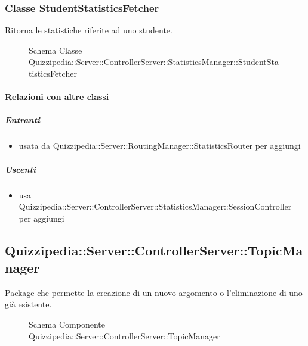 \subsubsection{Classe StudentStatisticsFetcher}
Ritorna le statistiche riferite ad uno studente.
\begin{figure}[H]
\centering
\noindent{}
\caption[Schema Classe StudentStatisticsFetcher]{Schema Classe Quizzipedia::Server::ControllerServer::StatisticsManager::StudentStatisticsFetcher}
\end{figure}
\paragraph{Relazioni con altre classi}
\subparagraph{Entranti}
\begin{itemize}
\item usata da Quizzipedia::Server::RoutingManager::StatisticsRouter per aggiungi
\end{itemize}
\subparagraph{Uscenti}
\begin{itemize}
\item usa Quizzipedia::Server::ControllerServer::StatisticsManager::SessionController per aggiungi
\end{itemize}
\subsection{Quizzipedia::Server::ControllerServer::TopicManager}
Package che permette la creazione di un nuovo argomento o l'eliminazione di uno già esistente.
\begin{figure}[H]
\centering
\noindent{}
\caption[Schema Componente Quizzipedia::Server::ControllerServer::TopicManager]{Schema Componente Quizzipedia::Server::ControllerServer::TopicManager}
\end{figure}
